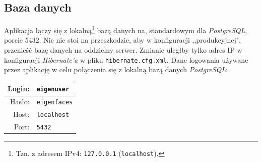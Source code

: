 \documentclass[a4paper,titlepage]{article}
\theoremstyle{break}
\numberwithin{equation}{subsection}
\begin{document}

\subsection{Baza danych}

Aplikacja łączy się z lokalną\footnote{Tzn. z adresem IPv4: \texttt{127.0.0.1} (\texttt{localhost}).} bazą danych na, standardowym dla \emph{PostgreSQL}, porcie 5432. Nic nie stoi na przeszkodzie, aby w konfiguracji ,,produkcyjnej", przenieść bazę danych na oddzielny serwer. Zmianie uległby tylko adres IP w konfiguracji \emph{Hibernate'a} w pliku \texttt{hibernate.cfg.xml}. Dane logowania używane przez aplikację w celu połączenia się z lokalną bazą danych \emph{PostgreSQL}:

\begin{tabular}{r|l}
Login: & \texttt{eigenuser}\\
\hline
Hasło: & \texttt{eigenfaces}\\
\hline
Host: & \texttt{localhost}\\
\hline
Port: & \texttt{5432}\\
\end{tabular}
\end{document}
